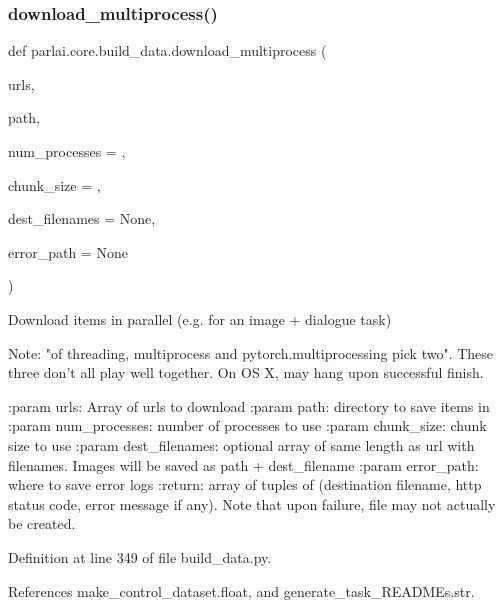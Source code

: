 \mbox{\label{namespaceparlai_1_1core_1_1build__data_ae259aeb321a77560fbcd23028178c897}} 
\subsubsection{\texorpdfstring{download\+\_\+multiprocess()}{download\_multiprocess()}}
{\footnotesize\ttfamily def parlai.\+core.\+build\+\_\+data.\+download\+\_\+multiprocess (\begin{DoxyParamCaption}\item[{}]{urls,  }\item[{}]{path,  }\item[{}]{num\+\_\+processes = {},  }\item[{}]{chunk\+\_\+size = {},  }\item[{}]{dest\+\_\+filenames = {\ttfamily None},  }\item[{}]{error\+\_\+path = {\ttfamily None} }\end{DoxyParamCaption})}

\begin{DoxyVerb}Download items in parallel (e.g. for an image + dialogue task)

Note: "of threading, multiprocess and pytorch.multiprocessing pick two".
These three don't all play well together. On OS X, may hang upon successful finish.

:param urls: Array of urls to download
:param path: directory to save items in
:param num_processes: number of processes to use
:param chunk_size: chunk size to use
:param dest_filenames: optional array of same length as url with filenames.
 Images will be saved as path + dest_filename
:param error_path: where to save error logs
:return: array of tuples of (destination filename, http status code, error
message if any). Note that upon failure, file may not actually be created.
\end{DoxyVerb}
 

Definition at line 349 of file build\+\_\+data.\+py.



References make\+\_\+control\+\_\+dataset.\+float, and generate\+\_\+task\+\_\+\+R\+E\+A\+D\+M\+Es.\+str.



